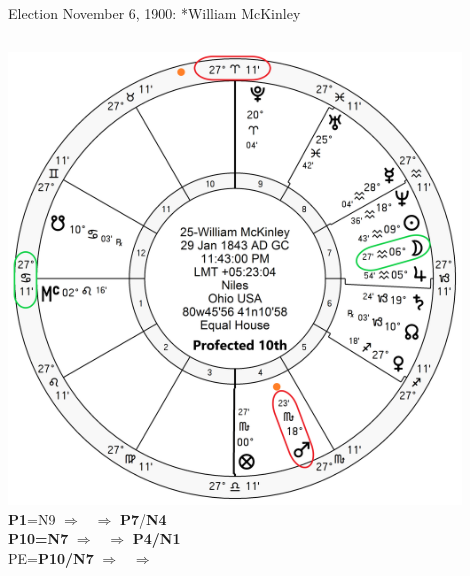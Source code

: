 \begin{frame}[t]{Election November 6, 1900: *William McKinley}
\begin{columns}[T, onlytextwidth]
\vspace{-1em}
{\includegraphics[width=0.9\textwidth]{charts/McKinley-Prof-10th.png}}
\textbf{\dgreen P1}=N9 
	$\Rightarrow$ \Moon\, $\Rightarrow$ \textbf{\red P7}/\textbf{\dgreen N4} \\
\textbf{\red P10=N7} 
	$\Rightarrow$  \Mars\, $\Rightarrow$  \textbf{\dgreen P4/N1} \\
PE=\textbf{\red P10/N7} 
	$\Rightarrow$  \Mars\, $\Rightarrow$  \textbf{}
\end{columns}
\end{frame}

